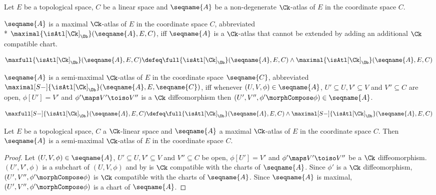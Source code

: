 \documentclass{article}
\begin{document}
\begin{definition}
\label{def:Ck-ATLmax}
Let $E$ be a topological space, $C$ be a linear space and $\seqname{A}$
be a non-degenerate $\Ck$-atlas of $E$ in the coordinate space $C$.

$\seqname{A}$ is a maximal $\Ck$-atlas of $E$ in the coordinate space
$C$, abbreviated \\*
$\maximal{\isAtl[\Ck]_\Ob}(\seqname{A}, E,C)$, iff $\seqname{A}$ is a
$\Ck$-atlas that cannot be extended by adding an additional $\Ck$
compatible chart.

\begin{equation}
  \maxfull{\isAtl[\Ck]_\Ob}(\seqname{A}, E, C) \defeq
    \full{\isAtl[\Ck]_\Ob}(\seqname{A}, E, C) \land
    \maximal{\isAtl[\Ck]_\Ob}(\seqname{A}, E, C)
\end{equation}

$\seqname{A}$ is a semi-maximal $\Ck$-atlas of $E$ in
the coordinate space $\seqname{C}$, abbreviated
$\maximal[S-]{\isAtl[\Ck]_\Ob}(\seqname{A}, E, \seqname{C})$, iff whenever
$(U,V,\phi) \in \seqname{A}$, $U' \subseteq U, V' \subseteq V$ and
$V'' \subseteq C$ are open, $\phi[U'] = V'$ and
$\phi' \maps V' \toiso V''$ is a $\Ck$ diffeomorphism then
$(U', V'', \phi' \morphCompose \phi) \in \seqname{A}$.

\begin{equation}
  \maxfull[S-]{\isAtl[\Ck]_\Ob}(\seqname{A}, E, C) \defeq
    \full{\isAtl[\Ck]_\Ob}(\seqname{A}, E, C) \land
    \maximal[S-]{\isAtl[\Ck]_\Ob}(\seqname{A}, E, C)
\end{equation}
\end{definition}

\begin{lemma}
Let $E$ be a topological space, $C$ a $\Ck$-linear space and
$\seqname{A}$ a maximal $\Ck$-atlas of $E$ in the coordinate space $C$.
Then $\seqname{A}$ is a semi-maximal $\Ck$-atlas of $E$ in the
coordinate space $C$.

\begin{proof}
Let $(U,V,\phi) \in \seqname{A}$, $U' \subseteq U, V' \subseteq V$ and
$V'' \subseteq C$ be open, $\phi[U'] = V'$ and
$\phi' \maps V' \toiso V''$ be a $\Ck$ diffeomorphism.  $(U', V', \phi)$
is a subchart of $(U,V,\phi)$ and by  is
$\Ck$ compatible with the charts of $\seqname{A}$. Since $\phi'$ is a
$\Ck$ diffeomorphism, $(U', V'', \phi' \morphCompose \phi)$ is $\Ck$
compatible with the charts of $\seqname{A}$.  Since $\seqname{A}$ is
maximal, $(U', V'', \phi' \morphCompose \phi)$ is a chart of $\seqname{A}$.
\end{proof}
\end{lemma}
\end{document}

